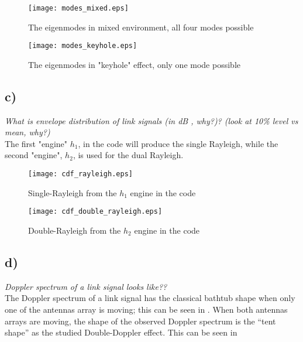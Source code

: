
\begin{figure}[!h]
  \centering
  \texttt{[image: modes\_mixed.eps]}
  \caption{The eigenmodes in mixed environment, all four modes possible}
  \label{fig:modes_mixed}
\end{figure}

\begin{figure}[!h]
  \centering
  \texttt{[image: modes\_keyhole.eps]}
  \caption{The eigenmodes in "keyhole" effect, only one mode possible}
  \label{fig:modes_mixed}
\end{figure}

\subsection{c)}
\textit{What is envelope distribution of link signals (in dB , why?)? (look at 10\% level vs mean, why?)}\\

The first "engine" $h_1$, in the code will produce the single Rayleigh, while the second "engine", $h_2$, is used for the dual Rayleigh.

\begin{figure}[!h]
  \centering
  \texttt{[image: cdf\_rayleigh.eps]}
  \caption{Single-Rayleigh from the $h_1$ engine in the code}
  \label{fig:modes_mixed}
\end{figure}

\begin{figure}[!h]
  \centering
  \texttt{[image: cdf\_double\_rayleigh.eps]}
  \caption{Double-Rayleigh from the $h_2$ engine in the code}
  \label{fig:modes_mixed}
\end{figure}

\subsection{d)}
\textit{Doppler spectrum of a link signal looks like??}\\

The Doppler spectrum of a link signal has the classical bathtub shape when only one of the antennas array is moving; this can be seen in . When both antennas arrays are moving, the shape of the observed Doppler spectrum is the ``tent shape'' as the studied Double-Doppler effect. This can be seen in 

